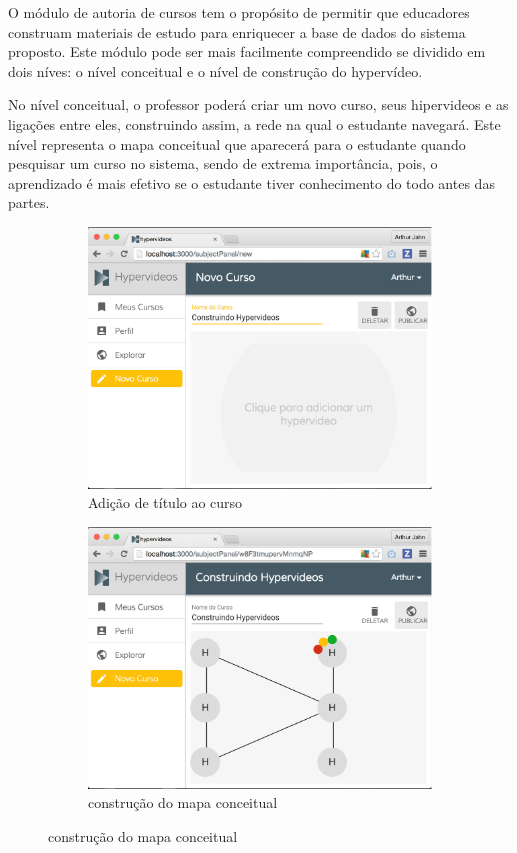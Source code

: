 O módulo de autoria de cursos tem o propósito de permitir que educadores construam materiais de estudo para enriquecer a base de dados do sistema proposto. Este módulo pode ser mais facilmente compreendido se dividido em dois níves: o nível conceitual e o nível de construção do hypervídeo.

No nível conceitual, o professor poderá criar um novo curso, seus hipervideos e as ligações entre eles, construindo assim, a rede na qual o estudante navegará. Este nível representa o mapa conceitual que aparecerá para o estudante quando pesquisar um curso no sistema, sendo de extrema importância, pois, o aprendizado é mais efetivo se o estudante tiver conhecimento do todo antes das partes.

\begin{figure}[h!]
  	\centering
  	\begin{subfigure}{.5\textwidth}
  		\centering
  		\includegraphics[width=.9\linewidth]{figuras/autoria_conceitual_a.eps}
  		\caption{Adição de título ao curso}
  		\label{fig:autoria_conceitual_a}
	\end{subfigure}%
	\begin{subfigure}{.5\textwidth}
  		\centering
  		\includegraphics[width=.9\linewidth]{figuras/autoria_conceitual_b.eps}
  		\caption{construção do mapa conceitual}
  		\label{fig:autoria_conceitual_b}
	\end{subfigure}%
	

\end{figure}
